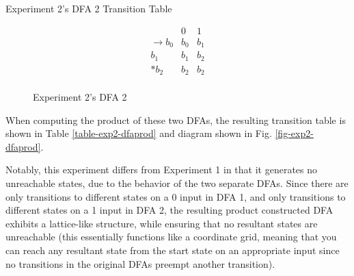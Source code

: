 \documentclass[conference]{IEEEtran}
\begin{document}
\begin{table}[h!]
    \caption{Experiment 2's DFA 2 Transition Table}
    \begin{displaymath}
        \begin{array}{r|c|c|}
        & 0 & 1 \\
        \hline
        \rightarrow b_0 & b_0 & b_1 \\
        b_1 & b_1 & b_2 \\
        * b_2 & b_2 & b_2 \\
        \end{array}
    \end{displaymath}
    \label{table-exp2-dfa2}
\end{table}
\begin{figure}[h!]
    \centering
    \caption{Experiment 2's DFA 2}
    \label{fig-exp2-dfa2}
\end{figure}

When computing the product of these two DFAs, the resulting transition table is shown in Table \ref{table-exp2-dfaprod} and diagram shown in Fig. \ref{fig-exp2-dfaprod}.

Notably, this experiment differs from Experiment 1 in that it generates no unreachable states, due to the behavior of the two separate DFAs. Since there are only transitions to different states on a 0 input in DFA 1, and only transitions to different states on a 1 input in DFA 2, the resulting product constructed DFA exhibits a lattice-like structure, while ensuring that no resultant states are unreachable (this essentially functions like a coordinate grid, meaning that you can reach any resultant state from the start state on an appropriate input since no transitions in the original DFAs preempt another transition).
\end{document}
